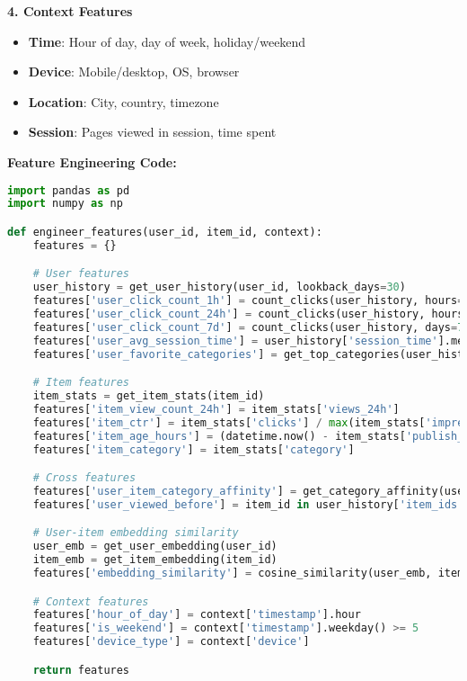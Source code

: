 \documentclass[10pt]{article}
\begin{document}
\textbf{4. Context Features}
\begin{itemize}
\item \textbf{Time}: Hour of day, day of week, holiday/weekend
\item \textbf{Device}: Mobile/desktop, OS, browser
\item \textbf{Location}: City, country, timezone
\item \textbf{Session}: Pages viewed in session, time spent
\end{itemize}

\textbf{Feature Engineering Code:}
\begin{lstlisting}[language=Python]
import pandas as pd
import numpy as np

def engineer_features(user_id, item_id, context):
    features = {}

    # User features
    user_history = get_user_history(user_id, lookback_days=30)
    features['user_click_count_1h'] = count_clicks(user_history, hours=1)
    features['user_click_count_24h'] = count_clicks(user_history, hours=24)
    features['user_click_count_7d'] = count_clicks(user_history, days=7)
    features['user_avg_session_time'] = user_history['session_time'].mean()
    features['user_favorite_categories'] = get_top_categories(user_history, top_k=3)

    # Item features
    item_stats = get_item_stats(item_id)
    features['item_view_count_24h'] = item_stats['views_24h']
    features['item_ctr'] = item_stats['clicks'] / max(item_stats['impressions'], 1)
    features['item_age_hours'] = (datetime.now() - item_stats['publish_time']).total_seconds() / 3600
    features['item_category'] = item_stats['category']

    # Cross features
    features['user_item_category_affinity'] = get_category_affinity(user_id, item_stats['category'])
    features['user_viewed_before'] = item_id in user_history['item_ids']

    # User-item embedding similarity
    user_emb = get_user_embedding(user_id)
    item_emb = get_item_embedding(item_id)
    features['embedding_similarity'] = cosine_similarity(user_emb, item_emb)

    # Context features
    features['hour_of_day'] = context['timestamp'].hour
    features['is_weekend'] = context['timestamp'].weekday() >= 5
    features['device_type'] = context['device']

    return features
\end{lstlisting}
\end{document}
